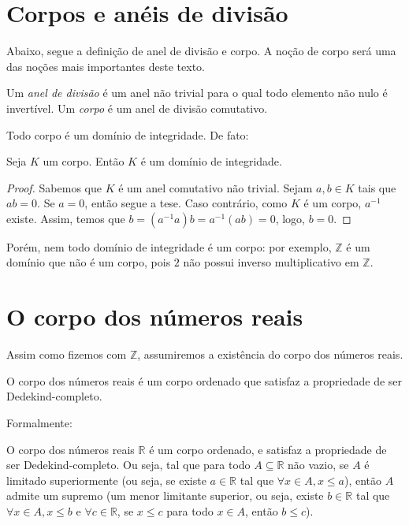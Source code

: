 \section{Corpos e anéis de divisão}

Abaixo, segue a definição de anel de divisão e corpo.
A noção de corpo será uma das noções mais importantes deste texto.
\begin{definition}
Um \emph{anel de divisão} é um anel não trivial para o qual todo elemento não nulo é invertível.
Um \emph{corpo} é um anel de divisão comutativo.
\end{definition}

Todo corpo é um domínio de integridade.
De fato:
\begin{prop}
    Seja $K$ um corpo.
    Então $K$ é um domínio de integridade.
\end{prop}
\begin{proof}
Sabemos que $K$ é um anel comutativo não trivial.
Sejam $a, b \in K$ tais que $ab=0$.
Se $a=0$, então segue a tese.
Caso contrário, como $K$ é um corpo, $a^{-1}$ existe.
Assim, temos que $b=(a^{-1}a)b=a^{-1}(ab)=0$, logo, $b=0$.
\end{proof}

Porém, nem todo domínio de integridade é um corpo: por exemplo, $\mathbb Z$ é um domínio que não é um corpo, pois $2$ não possui inverso multiplicativo em $\mathbb Z$.

\section{O corpo dos números reais}
Assim como fizemos com $\mathbb Z$, assumiremos a existência do corpo dos números reais.

O corpo dos números reais é um corpo ordenado que satisfaz a propriedade de ser Dedekind-completo.

Formalmente:

\begin{prop}
    O corpo dos números reais $\mathbb R$ é um corpo ordenado, e satisfaz a propriedade de ser Dedekind-completo.
    Ou seja, tal que para todo $A\subseteq \mathbb R$ não vazio, se $A$ é limitado superiormente (ou seja, se existe $a \in \mathbb R$ tal que $\forall x \in A, x\leq a$), então $A$ admite um supremo (um menor limitante superior, ou seja, existe $b \in \mathbb R$ tal que $\forall x \in A, x\leq b$ e $\forall c \in \mathbb R$, se $x\leq c$ para todo $x\in A$, então $b\leq c$).
\end{prop}

